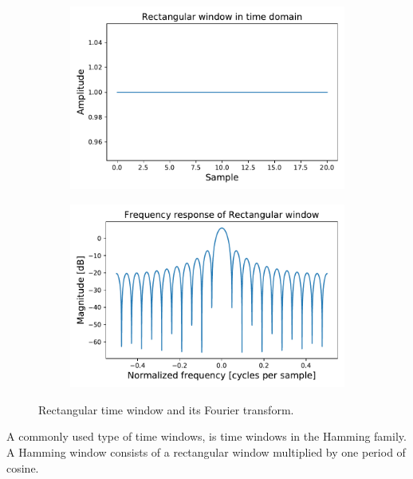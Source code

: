 \begin{figure}[H]
    \centering
    \begin{subfigure}[b]{.49\textwidth}
        \centering
        \includegraphics[width=\textwidth]{figures/RectangularTime.pdf}
         \caption{}
        \label{fig:RectangularTime}
    \end{subfigure}
    \begin{subfigure}[b]{.49\textwidth}
        \centering
        \includegraphics[width=\textwidth]{figures/RectangularFourier.pdf}
        \caption{}
        \label{fig:RectangularFourier}
    \end{subfigure}
\caption{Rectangular time window and its Fourier transform.}
\label{fig: Rectangular}
\end{figure}

A commonly used type of time windows, is time windows in the Hamming family. A Hamming window consists of a rectangular window multiplied by one period of cosine. 

